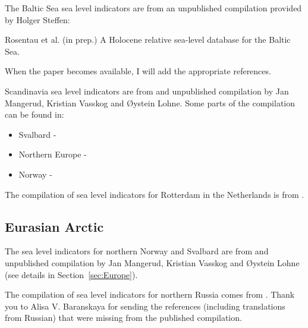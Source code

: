 The Baltic Sea sea level indicators are from an unpublished compilation provided by Holger Steffen:

Rosentau et al. (in prep.) A Holocene relative sea-level database for the Baltic Sea.

When the paper becomes available, I will add the appropriate references.

Scandinavia sea level indicators are from and unpublished compilation by Jan Mangerud, Kristian Vasskog and \O{}ystein Lohne. Some parts of the compilation can be found in:

\begin{itemize}
  \item Svalbard - \citet{BondevikEtal1995}
  \item Northern Europe - \citet{FormanEtal2004}
  \item Norway - \citet{LohneEtal2007,RomundsetEtal2010,RomundsetEtal2011,RomundsetEtal2015,RomundsetEtal2018,VasskogEtal2019}
\end{itemize}

The compilation of sea level indicators for Rotterdam in the Netherlands is from \citet{HijmaCohen2019}.


\subsection{Eurasian Arctic}

The sea level indicators for northern Norway and Svalbard are from and unpublished compilation by Jan Mangerud, Kristian Vasskog and \O{}ystein Lohne (see details in Section~\ref{sec:Europe}).

The compilation of sea level indicators for northern Russia comes from \citet{BaranskayaEtal2018}. Thank you to Alisa V. Baranskaya for sending the references (including translations from Russian) that were missing from the published compilation.

